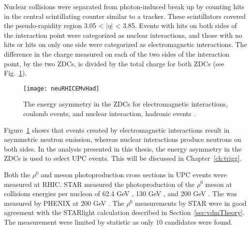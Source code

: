     Nuclear collisions were separated from photon-induced break up by counting
      hits in the central scintillating counter similar to a tracker.
    These scintillators covered the pseudo-rapidity region 3.05 < $|\eta|$ < 
      3.85.
    Events with hits on both sides of the interaction point were categorized as
      nuclear interactions, and those with no hits or hits on only one side were
      categorized as electromagnetic interactions. 
    The difference in the charge measured on each of the two sides of the 
      interaction point, by the two ZDCs, is divided by the total charge
      for both ZDCs (see Fig.~\ref{fig:neuRHICEMvHad}).
    \begin{figure}[!Hhbt]
      \centering
      \texttt{[image: neuRHICEMvHad]}
      \caption{The energy asymmetry in the ZDCs for electromagnetic interactions, 
        coulomb events, and nuclear interaction, hadronic events \cite{upcNeuPHENIX}.}
      \label{fig:neuRHICEMvHad}
    \end{figure}
    Figure~\ref{fig:neuRHICEMvHad} shows that events created by electromagnetic 
      interactions result in asymmetric neutron emission, whereas nuclear 
      interactions produce neutrons on both sides. 
    In the analysis presented in this thesis, the energy asymmetry in the ZDCs is
      used to select UPC events.
    This will be discussed in Chapter~\ref{ch:trigg}.
    
    Both the $\rho^{0}$ and \JPsi{} meson photoproduction cross sections in UPC 
      events were measured at RHIC.
    STAR measured the photoproduction of the $\rho^{0}$ meson at collisions 
      energies per nucleon of 62.4 GeV \cite{upcRhoSTAR12}, 130 GeV 
      \cite{upcRhoSTAR02}, and 200 GeV \cite{upcRhoSTAR08}. 
    The \JPsi{} was measured by PHENIX at 200 GeV \cite{upcJPsiPHENIX}.
    The $\rho^{0}$ measurements by STAR were in good agreement with the STARlight
      calculation described in Section~\ref{sec:vdmTheory}.
    The \JPsi{} measurement were limited by statistic as only 10 \JPsi{}
      candidates were found. 

